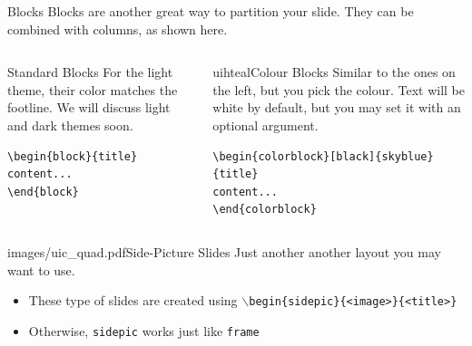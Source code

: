 \documentclass{beamer}
\begin{document}
\begin{frame}[fragile]{Blocks}
Blocks are another great way to partition your slide. They can be combined with columns, as shown here.
\begin{columns}
\begin{column}{0.3\textwidth}
\begin{block}{Standard Blocks}
For the light theme, their color matches the footline. We will discuss light and dark themes soon.
\begin{verbatim}
\begin{block}{title}
content...
\end{block}
\end{verbatim}
\end{block}
\end{column}
\begin{column}{0.7\textwidth}
\begin{colorblock}[black]{uihteal}{Colour Blocks}
Similar to the ones on the left, but you pick the colour. Text will be white by 
default, but you may set it with an optional argument.
\small
\begin{verbatim}
\begin{colorblock}[black]{skyblue}{title}
content...
\end{colorblock}
\end{verbatim}
\end{colorblock}
\end{column}
\end{columns}
\end{frame}


\begin{sidepic}{images/uic_quad.pdf}{Side-Picture Slides}
Just another another layout you may want to use.
\begin{itemize}
\item These type of slides are created using \texttt{$\backslash$begin\{sidepic\}\{<image>\}\{<title>\}}
\item Otherwise, \texttt{sidepic} works just like \texttt{frame}
\end{itemize}
\end{sidepic}


\renewcommand{\algorithmicrequire}{\textbf{Input:}}
\renewcommand{\algorithmicensure}{\textbf{Output:}}
\newcommand*\CALL[2]{\textsc{#1}(#2)}
\newcommand*\ANNOTATE[1]{\hfill\(\triangleright\) #1}%

\footlinecolor{}
\end{document}
